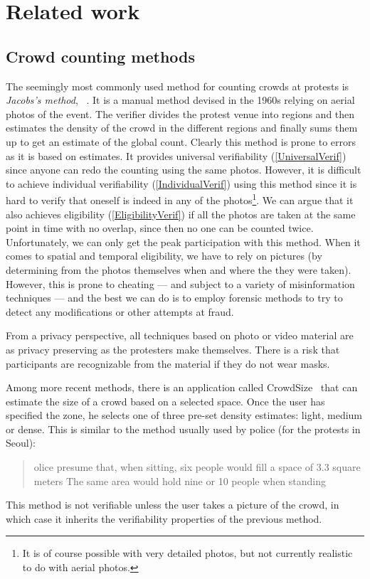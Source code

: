 \section{Related work}%
\label{RelatedWork}

\subsection{Crowd counting methods}

The seemingly most commonly used method for counting crowds at protests is 
\emph{Jacobs's method}, \cf~\cite{%
  2016DemonstrationsInSeoul,%
  BBCHowToCountProtestNumbers,%
  HowWillWeKnowTrumpInauguralCrowdSize,%
  TheXManMarch,%
  TheCrowdNumbersGame,%
}.
It is a manual method devised in the 1960s relying on aerial photos of the event.
The verifier divides the protest venue into regions and then estimates the density of the crowd in the different regions and finally sums them up to get an estimate of the global count.
Clearly this method is prone to errors as it is based on estimates.
It provides universal verifiability (\cref{UniversalVerif}) since anyone can redo the counting using the same photos.
However, it is difficult to achieve individual verifiability (\cref{IndividualVerif}) using this method since it is hard to verify that oneself is indeed in any of the photos\footnote{It is of course possible with very detailed photos, but not currently realistic to do with aerial photos.}.
We can argue that it also achieves eligibility (\cref{EligibilityVerif}) if all the photos are taken at the same point in time with no overlap, since then no one can be counted twice.
Unfortunately, we can only get the peak participation with this method.
When it comes to spatial and temporal eligibility, we have to rely on pictures (\eg by determining from the photos themselves when and where the they were taken).
However, this is prone to cheating --- and subject to a variety of 
misinformation techniques --- and the best we can do is to employ forensic 
methods to try to detect any modifications or other attempts at fraud.

From a privacy perspective, all techniques based on photo or video material are 
as privacy preserving as the protesters make themselves.
There is a risk that participants are recognizable from the material if they do 
not wear masks.

Among more recent methods, there is an application called CrowdSize~\cite{CrowdSize} that can estimate the size of a crowd 
based on a selected space.
Once the user has specified the zone, he selects one of three pre-set density estimates: light, medium or dense.
This is similar to the method usually used by police (\eg for the protests in 
Seoul):
\blockcquote{2016DemonstrationsInSeoul}{%
  olice presume that, when sitting, six people would 
  fill a space of 
  3.3 square meters
  \textelp{}
  The same area would hold nine or 10 people when standing%
}.
This method is not verifiable unless the user takes a picture of the crowd, in which case it inherits the verifiability properties of the previous method.

